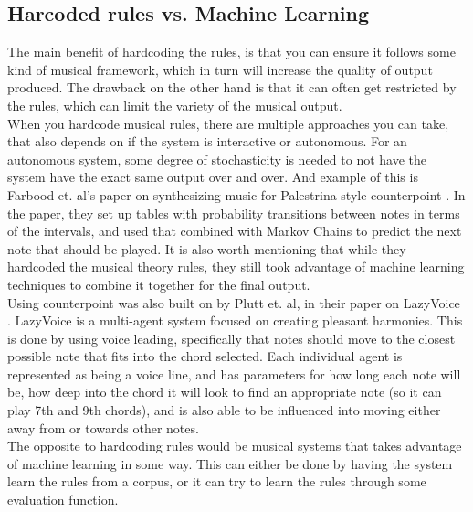 \documentclass[a4paper,english]{report}
\begin{document}
	\subsection{Harcoded rules vs. Machine Learning}
	The main benefit of hardcoding the rules, is that you can ensure it follows some kind of musical framework, which in turn will increase the quality of output produced. The drawback on the other hand is that it can often get restricted by the rules, which can limit the variety of the musical output.\\
	When you hardcode musical rules, there are multiple approaches you can take, that also depends on if the system is interactive or autonomous. For an autonomous system, some degree of stochasticity is needed to not have the system have the exact same output over and over. And example of this is Farbood et. al's paper on synthesizing music for Palestrina-style counterpoint \cite{farbood2001analysis}. In the paper, they set up tables with probability transitions between notes in terms of the intervals, and used that combined with Markov Chains to predict the next note that should be played. It is also worth mentioning that while they hardcoded the musical theory rules, they still took advantage of machine learning techniques to combine it together for the final output.\\
	Using counterpoint was also built on by Plutt et. al, in their paper on LazyVoice \cite{plutt2021lazyvoice}. LazyVoice is a multi-agent system focused on creating pleasant harmonies. This is done by using voice leading, specifically that notes should move to the closest possible note that fits into the chord selected. Each individual agent is represented as being a voice line, and has parameters for how long each note will be, how deep into the chord it will look to find an appropriate note (so it can play 7th and 9th chords), and is also able to be influenced into moving either away from or towards other notes.\\
	The opposite to hardcoding rules would be musical systems that takes advantage of machine learning in some way. This can either be done by having the system learn the rules from a corpus, or it can try to learn the rules through some evaluation function.\\
\end{document}
